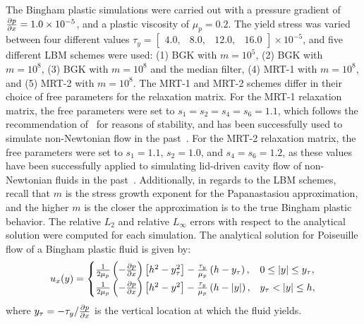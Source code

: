 The Bingham plastic simulations were carried out with a pressure gradient of $\frac{\partial p}{\partial x} = 1.0 \times 10^{-5}$, and a plastic viscosity of $\mu_p = 0.2$.
The yield stress was varied between four different values $\tau_y = \begin{bmatrix}4.0,&8.0,&12.0,&16.0\end{bmatrix} \times 10^{-5}$, and five different LBM schemes were used: (1) BGK with $m = 10^5$, (2) BGK with $m = 10^8$, (3) BGK with $m = 10^8$ and the median filter, (4) MRT-1 with $m = 10^8$, and (5) MRT-2 with $m = 10^8$.
The MRT-1 and MRT-2 schemes differ in their choice of free parameters for the relaxation matrix.
For the MRT-1 relaxation matrix, the free parameters were set to $s_1 = s_2 = s_4 = s_6 = 1.1$, which follows the recommendation of~\cite{lallemand2000theory} for reasons of stability, and has been successfully used to simulate non-Newtonian flow in the past~\cite{fallah2012multiple,grasinger2015simulation}. 
For the MRT-2 relaxation matrix, the free parameters were set to $s_1 = 1.1$, $s_2 = 1.0$, and $s_4 = s_6 = 1.2$, as these values have been successfully applied to simulating lid-driven cavity flow of non-Newtonian fluids in the past~\cite{chen2014simulations,li2014simulation}.
Additionally, in regards to the LBM schemes, recall that $m$ is the stress growth exponent for the Papanastasiou approximation, and the higher $m$ is the closer the approximation is to the true Bingham plastic behavior.
\DIFaddbegin {}\DIFaddend The relative $L_2$ and relative $L_{\infty}$ errors with respect to the analytical solution were computed for each simulation.
The analytical solution for Poiseuille flow of a Bingham plastic fluid is given by:
\begin{equation} \label{eq:analytical-bingham}
u_x(y) = \begin{cases}
\frac{1}{2 \mu_p} \left(-\frac{\partial p}{\partial x}\right) \left[h^2 - y_{\tau}^2 \right] - \frac{\tau_y}{\mu_p} \left(h - y_{\tau}\right), & 0 \leq |y| \leq y_{\tau}, \\
\frac{1}{2 \mu_p} \left(-\frac{\partial p}{\partial x}\right) \left[h^2 - y^2 \right] - \frac{\tau_y}{\mu_p} \left(h - |y|\right), & y_{\tau} < |y| \leq h,
\end{cases}
\end{equation}
\noindent where $y_{\tau} = -\tau_y / \frac{\partial p}{\partial x}$ is the vertical location at which the fluid yields.
